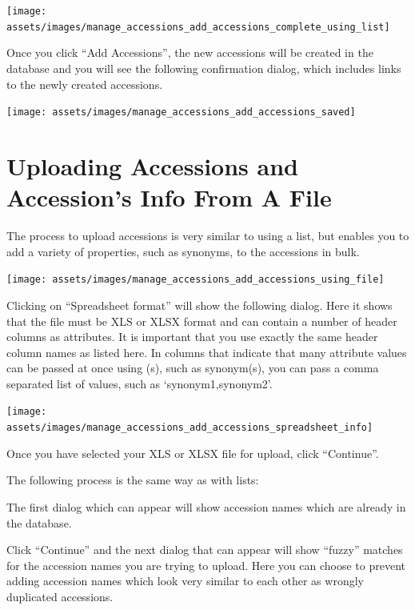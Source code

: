 \documentclass[
  12pt,
]{book}
\begin{document}
\begin{center}\texttt{[image: assets/images/manage\_accessions\_add\_accessions\_complete\_using\_list]} \end{center}

Once you click ``Add Accessions'', the new accessions will be created in the database and you will see the following confirmation dialog, which includes links to the newly created accessions.

\begin{center}\texttt{[image: assets/images/manage\_accessions\_add\_accessions\_saved]} \end{center}

\hypertarget{uploading-accessions-and-accessions-info-from-a-file}{%
\section{Uploading Accessions and Accession's Info From A File}\label{uploading-accessions-and-accessions-info-from-a-file}}

The process to upload accessions is very similar to using a list, but enables you to add a variety of properties, such as synonyms, to the accessions in bulk.

\begin{center}\texttt{[image: assets/images/manage\_accessions\_add\_accessions\_using\_file]} \end{center}

Clicking on ``Spreadsheet format'' will show the following dialog. Here it shows that the file must be XLS or XLSX format and can contain a number of header columns as attributes. It is important that you use exactly the same header column names as listed here. In columns that indicate that many attribute values can be passed at once using (s), such as synonym(s), you can pass a comma separated list of values, such as `synonym1,synonym2'.

\begin{center}\texttt{[image: assets/images/manage\_accessions\_add\_accessions\_spreadsheet\_info]} \end{center}

Once you have selected your XLS or XLSX file for upload, click ``Continue''.

The following process is the same way as with lists:

The first dialog which can appear will show accession names which are already in the database.

Click ``Continue'' and the next dialog that can appear will show ``fuzzy'' matches for the accession names you are trying to upload. Here you can choose to prevent adding accession names which look very similar to each other as wrongly duplicated accessions.
\end{document}
